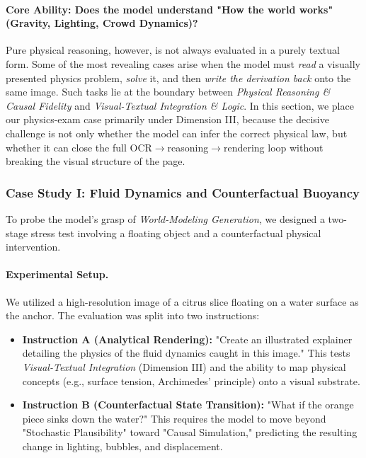 \paragraph{Core Ability: Does the model understand "How the world works" (Gravity, Lighting, Crowd Dynamics)?}
Pure physical reasoning, however, is not always evaluated in a purely textual form. Some of the most revealing cases arise when the model must \emph{read} a visually presented physics problem, \emph{solve} it, and then \emph{write the derivation back} onto the same image. Such tasks lie at the boundary between \textit{Physical Reasoning \& Causal Fidelity} and \textit{Visual-Textual Integration \& Logic}. In this section, we place our physics-exam case primarily under Dimension III, because the decisive challenge is not only whether the model can infer the correct physical law, but whether it can close the full OCR$\rightarrow$reasoning$\rightarrow$rendering loop without breaking the visual structure of the page.

\subsubsection{Case Study I: Fluid Dynamics and Counterfactual Buoyancy}
\label{subsubsec:fluid_dynamics_case}

To probe the model's grasp of \textit{World-Modeling Generation}, we designed a two-stage stress test involving a floating object and a counterfactual physical intervention.

\paragraph{Experimental Setup.}
We utilized a high-resolution image of a citrus slice floating on a water surface as the anchor. The evaluation was split into two instructions:
\begin{itemize}
\item \textbf{Instruction A (Analytical Rendering):} "Create an illustrated explainer detailing the physics of the fluid dynamics caught in this image." This tests \textit{Visual-Textual Integration} (Dimension III) and the ability to map physical concepts (e.g., surface tension, Archimedes' principle) onto a visual substrate.
\item \textbf{Instruction B (Counterfactual State Transition):} "What if the orange piece sinks down the water?" This requires the model to move beyond "Stochastic Plausibility" toward "Causal Simulation," predicting the resulting change in lighting, bubbles, and displacement.
\end{itemize}



